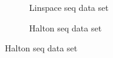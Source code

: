 \documentclass[a4paper,12pt]{article}
\begin{document}
\begin{figure} [H]
     \centering
     \begin{subfigure}[b]{0.49\textwidth}
         \centering
    \caption{Linspace seq data set}
    \label{fig:linspace_training_points}
     \end{subfigure}
     \hfill
     \begin{subfigure}[b]{0.49\textwidth}
         \centering
    \caption{Halton seq data set}
    \label{fig:halton_training_points}
     \end{subfigure}
     \hfill
     

\end{figure}
\end{document}
